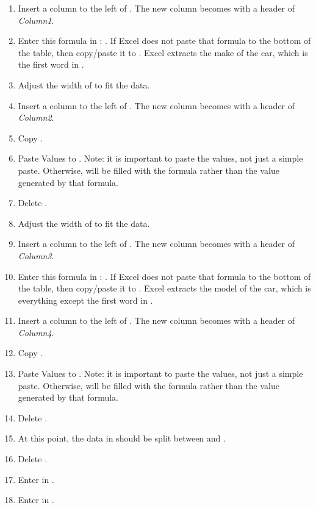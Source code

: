 \begin{enumerate}[resume]
	\begin{enumerate}
		\item Insert a column to the left of . The new column becomes  with a header of \textit{Column1}.
		\item Enter this formula in : . If Excel does not paste that formula to the bottom of the table, then copy/paste it to . Excel extracts the make of the car, which is the first word in .
		\item Adjust the width of  to fit the data.
		\item Insert a column to the left of . The new column becomes  with a header of \textit{Column2}.
		\item Copy .
		\item Paste Values to . Note: it is important to paste the values, not just a simple paste. Otherwise,  will be filled with the formula rather than the value generated by that formula.
		\item Delete .
		\item Adjust the width of  to fit the data.

		\item Insert a column to the left of . The new column becomes  with a header of \textit{Column3}.
		\item Enter this formula in : . If Excel does not paste that formula to the bottom of the table, then copy/paste it to . Excel extracts the model of the car, which is everything except the first word in .
		\item Insert a column to the left of . The new column becomes  with a header of \textit{Column4}.
		\item Copy .
		\item Paste Values to . Note: it is important to paste the values, not just a simple paste. Otherwise,  will be filled with the formula rather than the value generated by that formula.
		\item Delete .
		\item At this point, the data in  should be split between  and .
		\item Delete .
		\item Enter  in .
		\item Enter  in .


\end{enumerate}
\end{enumerate}
